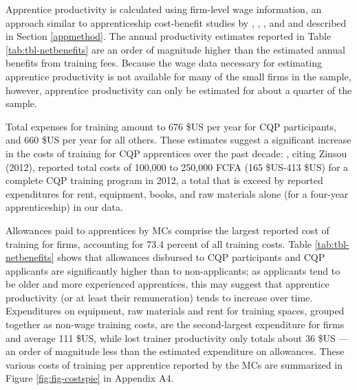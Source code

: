 \documentclass[
  a4paper, twoside, 12pt]{book}
\begin{document}
Apprentice productivity is calculated using firm-level wage information, an approach similar to apprenticeship cost-benefit studies by \textcite{wolter2015}, \textcite{muhlemann2018}, \textcite{bolli2020}, and \textcite{bolli2021} and described in Section \ref{appmethod}. The annual productivity estimates reported in Table \ref{tab:tbl-netbenefits} are an order of magnitude higher than the estimated annual benefits from training fees. Because the wage data necessary for estimating apprentice productivity is not available for many of the small firms in the sample, however, apprentice productivity can only be estimated for about a quarter of the sample.

Total expenses for training amount to 676 \$US per year for CQP participants, and 660 \$US per year for all others. These estimates suggest a significant increase in the costs of training for CQP apprentices over the past decade: \textcite{david-gnahoui2017}, citing Zinsou (2012), reported total costs of 100,000 to 250,000 FCFA (165 \$US-413 \$US) for a complete CQP training program in 2012, a total that is exceed by reported expenditures for rent, equipment, books, and raw materials alone (for a four-year apprenticeship) in our data.

Allowances paid to apprentices by MCs comprise the largest reported cost of training for firms, accounting for 73.4 percent of all training costs. Table \ref{tab:tbl-netbenefits} shows that allowances disbursed to CQP participants and CQP applicants are significantly higher than to non-applicants; as applicants tend to be older and more experienced apprentices, this may suggest that apprentice productivity (or at least their remuneration) tends to increase over time. Expenditures on equipment, raw materials and rent for training spaces, grouped together as non-wage training costs, are the second-largest expenditure for firms and average 111 \$US, while lost trainer productivity only totals about 36 \$US --- an order of magnitude less than the estimated expenditure on allowances. These various costs of training per apprentice reported by the MCs are summarized in Figure \ref{fig:fig-costspie} in Appendix A4.
\end{document}
